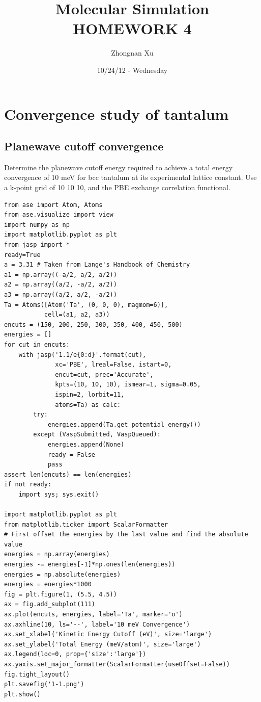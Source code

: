 \documentclass[11pt]{article}
\title{Molecular Simulation HOMEWORK 4}
\author{Zhongnan Xu}
\date{10/24/12 - Wednesday}
\begin{document}
\maketitle

\setcounter{tocdepth}{3}
\tableofcontents
\vspace*{1cm}


\section{Convergence study of tantalum}
\label{sec-1}
\subsection{Planewave cutoff convergence}
\label{sec-1-1}

Determine the planewave cutoff energy required to achieve a total energy convergence of 10 meV for bcc tantalum at its experimental lattice constant. Use a k-point grid of 10 \texttimes{} 10 \texttimes{} 10, and the PBE exchange correlation functional.


\begin{verbatim}
from ase import Atom, Atoms
from ase.visualize import view
import numpy as np
import matplotlib.pyplot as plt
from jasp import *
ready=True
a = 3.31 # Taken from Lange's Handbook of Chemistry 
a1 = np.array((-a/2, a/2, a/2))
a2 = np.array((a/2, -a/2, a/2))
a3 = np.array((a/2, a/2, -a/2))
Ta = Atoms([Atom('Ta', (0, 0, 0), magmom=6)],
           cell=(a1, a2, a3))
encuts = (150, 200, 250, 300, 350, 400, 450, 500)
energies = []
for cut in encuts:
    with jasp('1.1/e{0:d}'.format(cut),
              xc='PBE', lreal=False, istart=0,
              encut=cut, prec='Accurate',
              kpts=(10, 10, 10), ismear=1, sigma=0.05,
              ispin=2, lorbit=11,
              atoms=Ta) as calc:
        try:
            energies.append(Ta.get_potential_energy())
        except (VaspSubmitted, VaspQueued):
            energies.append(None)
            ready = False
            pass
assert len(encuts) == len(energies)
if not ready:
    import sys; sys.exit()

import matplotlib.pyplot as plt
from matplotlib.ticker import ScalarFormatter
# First offset the energies by the last value and find the absolute value
energies = np.array(energies)
energies -= energies[-1]*np.ones(len(energies))
energies = np.absolute(energies)
energies = energies*1000
fig = plt.figure(1, (5.5, 4.5))
ax = fig.add_subplot(111)
ax.plot(encuts, energies, label='Ta', marker='o')
ax.axhline(10, ls='--', label='10 meV Convergence')
ax.set_xlabel('Kinetic Energy Cutoff (eV)', size='large')
ax.set_ylabel('Total Energy (meV/atom)', size='large')
ax.legend(loc=0, prop={'size':'large'})
ax.yaxis.set_major_formatter(ScalarFormatter(useOffset=False))
fig.tight_layout()
plt.savefig('1-1.png')
plt.show()
\end{verbatim}
\end{document}

